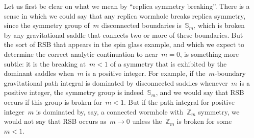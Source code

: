 \documentclass[12pt]{article}
\begin{document}
Let us first be clear on what we mean by ``replica symmetry breaking''. There is a sense in which we could say that any replica wormhole breaks replica symmetry, since the symmetry group of~$m$ disconnected boundaries is~$\mathbb{S}_m$, which is broken by any gravitational saddle that connects two or more of these boundaries.  But the sort of RSB that appears in the spin glass example, and which we expect to determine the correct analytic continuation to near~$m = 0$, is something more subtle: it is the breaking at~$m < 1$ of a symmetry that is exhibited by the dominant saddles when~$m$ is a positive integer.  For example, if the~$m$-boundary gravitational path integral is dominated by disconnected saddles whenever~$m$ is a positive integer, the symmetry group is indeed~$\mathbb{S}_m$, and we would say that RSB occurs if this group is broken for~$m < 1$.  But if the path integral for positive integer~$m$ is dominated by, say, a connected wormhole with~$\mathbb{Z}_m$ symmetry, we would not say that RSB occurs as~$m \to 0$ unless the~$\mathbb{Z}_m$ is broken for some~$m < 1$.
\end{document}

